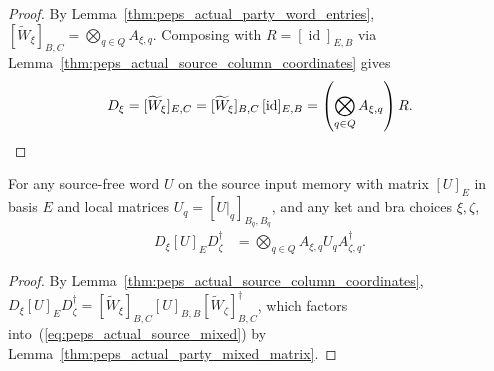\begin{proof}
    \leanok
    By Lemma~\ref{thm:peps_actual_party_word_entries},
    $[\widetilde W_\xi]_{B,C}=\bigotimes_{q\in Q}A_{\xi,q}$. Composing with
    $R=[\operatorname{id}]_{E,B}$ via
    Lemma~\ref{thm:peps_actual_source_column_coordinates} gives
    \begin{align}
        D_\xi=[\widetilde W_\xi]_{E,C}
            =[\widetilde W_\xi]_{B,C}\,[\operatorname{id}]_{E,B}
        =\left(\bigotimes_{q\in Q}A_{\xi,q}\right)R.\notag
    \end{align}
\end{proof}

\begin{lemma}
    \label{thm:peps_actual_source_mixed_word}
    \leanok
    For any source-free word $U$ on the source input memory with matrix $[U]_E$
    in basis $E$ and local matrices $U_q=[U|_q]_{B_q,B_q}$, and any ket and bra
    choices $\xi,\zeta$,
    \begin{align}
        D_\xi[U]_E D_\zeta^\dagger
         & =\bigotimes_{q\in Q}
        A_{\xi,q}U_q A_{\zeta,q}^\dagger.
        \label{eq:peps_actual_source_mixed}
    \end{align}
\end{lemma}

\begin{proof}\leanok
    By
    Lemma~\ref{thm:peps_actual_source_column_coordinates},
    $D_\xi[U]_E D_\zeta^\dagger=[\widetilde W_\xi]_{B,C}[U]_{B,B}[\widetilde W_\zeta]_{B,C}^\dagger$,
    which factors into~(\ref{eq:peps_actual_source_mixed}) by
    Lemma~\ref{thm:peps_actual_party_mixed_matrix}.
\end{proof}

